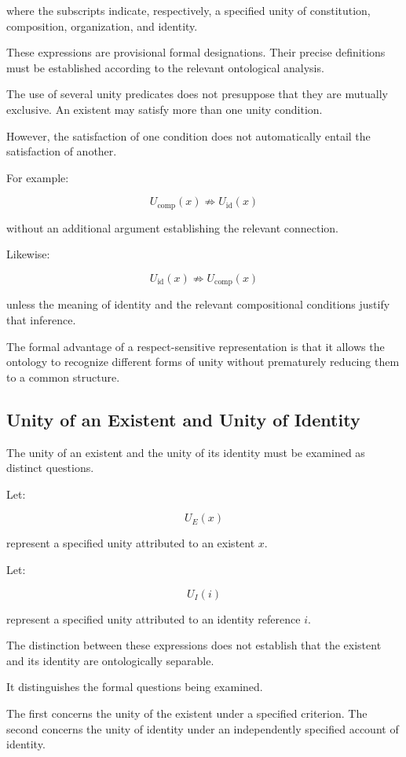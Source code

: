 where the subscripts indicate, respectively,
a specified unity of constitution, composition,
organization, and identity.

These expressions are provisional formal
designations. Their precise definitions must
be established according to the relevant
ontological analysis.

The use of several unity predicates does not
presuppose that they are mutually exclusive.
An existent may satisfy more than one unity
condition.

However, the satisfaction of one condition
does not automatically entail the satisfaction
of another.

For example:

\[
    U_{\mathrm{comp}}(x)
    \not\Rightarrow
    U_{\mathrm{id}}(x)
\]

without an additional argument establishing
the relevant connection.

Likewise:

\[
    U_{\mathrm{id}}(x)
    \not\Rightarrow
    U_{\mathrm{comp}}(x)
\]

unless the meaning of identity and the relevant
compositional conditions justify that inference.

The formal advantage of a respect-sensitive
representation is that it allows the ontology
to recognize different forms of unity without
prematurely reducing them to a common structure.

\subsection{Unity of an Existent and Unity of Identity}

The unity of an existent and the unity of its
identity must be examined as distinct questions.

Let:

\[
    U_E(x)
\]

represent a specified unity attributed to an
existent \(x\).

Let:

\[
    U_I(i)
\]

represent a specified unity attributed to an
identity reference \(i\).

The distinction between these expressions
does not establish that the existent and its
identity are ontologically separable.

It distinguishes the formal questions being
examined.

The first concerns the unity of the existent
under a specified criterion. The second concerns
the unity of identity under an independently
specified account of identity.

